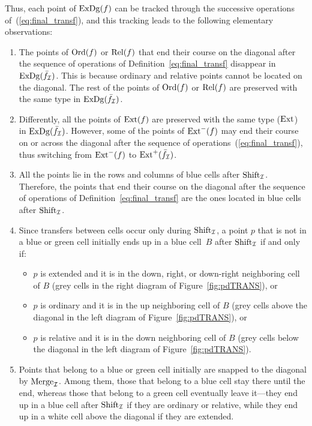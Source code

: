 %
Thus, each point of $\mathrm{ExDg}(f)$ can be tracked through the successive
operations of~(\ref{eq:final_transf}), and this tracking leads to the
following elementary observations:
%
\begin{enumerate}
\item The points of $\mathrm{Ord}(f)$ or $\mathrm{Rel}(f)$ that end their course on
  the diagonal after the sequence of
  operations of Definition~\ref{eq:final_transf} disappear in $\mathrm{ExDg}(\bar f_{\mathcal I})$. This is
  because ordinary and relative points cannot be located on the
  diagonal. The rest of the points of $\mathrm{Ord}(f)$ or $\mathrm{Rel}(f)$ are
  preserved with the same type in $\mathrm{ExDg}(\bar f_{\mathcal I})$.
\item Differently, all the points of $\mathrm{Ext}(f)$ are preserved with the
  same type ($\mathrm{Ext}$) in $\mathrm{ExDg}(\bar f_{\mathcal I})$. However, some of the points of
  $\mathrm{Ext}^-(f)$ may end their course on or across the diagonal after the
  sequence of operations~(\ref{eq:final_transf}), thus switching from
  $\mathrm{Ext}^-(f)$ to $\mathrm{Ext}^+(\bar f_{\mathcal I})$. 
\item All the points lie in the rows and columns of blue cells after
  $\mathrm{Shift}_{\mathcal{I}}$. Therefore, the points that end their course on the diagonal after
  the sequence of operations of Definition~\ref{eq:final_transf} are the ones
  located in blue cells after $\mathrm{Shift}_{\mathcal{I}}$.
\item Since transfers between cells occur only during $\mathrm{Shift}_{\mathcal{I}}$, a
  point $p$ that is not in a blue or green cell initially ends up in a
  blue cell~$B$ after $\mathrm{Shift}_{\mathcal{I}}$ if and only if:
\begin{itemize}
	\item $p$ is extended and it is in the down, right, or
          down-right neighboring cell of $B$ (grey cells in the right
          diagram of Figure~\ref{fig:pdTRANS}), or
	\item $p$ is ordinary and it is in the up neighboring cell of
          $B$ (grey cells above the diagonal in the left diagram of
          Figure~\ref{fig:pdTRANS}), or
	\item $p$ is relative and it is in the down neighboring cell
          of $B$ (grey cells below the diagonal in the left diagram
          of Figure~\ref{fig:pdTRANS}).
\end{itemize}
\item Points that belong to a blue or green cell initially are snapped
  to the diagonal by $\mathrm{Merge}_{\mathcal{I}}$. Among them, those that
  belong to a blue cell stay there until the end, whereas those that
  belong to a green cell eventually leave it---they end up in a blue
  cell after $\mathrm{Shift}_{\mathcal{I}}$ if they are ordinary or relative, while they end
  up in a white cell above the diagonal if they are extended.
\end{enumerate}

